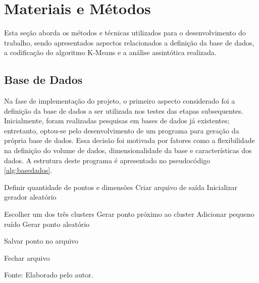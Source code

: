 \documentclass[10pt,a4paper,twocolumn]{article}
\begin{document}
\section{Materiais e Métodos}
Esta seção aborda os métodos e técnicas utilizados para o desenvolvimento do trabalho, sendo  apresentados aspectos relacionados a definição da base de dados, a codificação do algoritmo K-Means e a análise assintótica realizada. 

\subsection{Base de Dados} %
\label{sec:basedados}

Na fase de implementação do projeto, o primeiro aspecto considerado foi a definição da base de dados a ser utilizada nos testes das etapas subsequentes. Inicialmente, foram realizadas pesquisas em bases de dados já existentes; entretanto, optou-se pelo desenvolvimento de um programa para geração da própria base de dados. Essa decisão foi motivada por fatores como a flexibilidade na definição do volume de dados, dimensionalidade da base e características dos dados. A estrutura deste programa é apresentado no pseudocódigo \ref{alg:basedados}. 

\begin{algorithm}[htbp]
\caption{Geração da Base Dados}
\label{alg:basedados}
\begin{algorithmic}[1]

\State Definir quantidade de pontos e dimensões
\State Criar arquivo de saída
\State Inicializar gerador aleatório

    
        \State Escolher um dos três clusters
        \State Gerar ponto próximo ao cluster
        \State Adicionar pequeno ruído
    \Else
        \State Gerar ponto aleatório
    \EndIf
    
    \State Salvar ponto no arquivo
    
\EndFor

\State Fechar arquivo

\end{algorithmic}
\vspace{2pt} %
{\small Fonte: Elaborado pelo autor.}
\end{algorithm}
\end{document}
